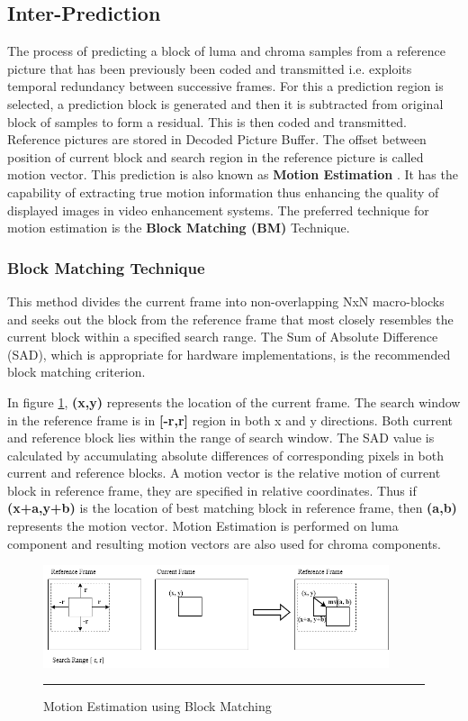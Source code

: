 
\subsection{Inter-Prediction}
The process of predicting a block of luma and chroma samples from a reference picture that has been previously been coded and transmitted i.e. exploits temporal redundancy between successive frames. For this a prediction region is selected, a prediction block is generated and then it is subtracted from original block of samples to form a residual. This is then coded and transmitted. Reference pictures are stored in Decoded Picture Buffer. The offset between position of current block and search region in the reference picture is called motion vector. This prediction is also known as \textbf{Motion Estimation} \cite{kalaycioglu2011low}. It has the capability of extracting true motion information thus enhancing the quality of displayed images in video enhancement systems. The preferred technique for motion estimation is the \textbf{Block Matching (BM)} Technique. 


\subsubsection{Block Matching Technique}
This method divides the current frame into non-overlapping NxN macro-blocks and seeks out the block from the reference frame that most closely resembles the current block within a specified search range. The Sum of Absolute Difference (SAD), which is appropriate for hardware implementations, is the recommended block matching criterion.

In figure \ref{fig:mv}, \textbf{(x,y)} represents the location of the current frame. The search window in the reference frame is in \textbf{[-r,r]} region in both x and y directions. Both current and reference block lies within the range of search window. The SAD value is calculated by accumulating absolute differences of corresponding pixels in both current and reference blocks. A motion vector is the relative motion of current block in reference frame, they are specified in relative coordinates. Thus if \textbf{(x+a,y+b)} is the location of best matching block in reference frame, then \textbf{(a,b)} represents the motion vector. Motion Estimation is performed on luma component and resulting motion vectors are also used for chroma components.

\begin{figure}[htbp]
	\centering
	\includegraphics[width = 4in]{./Figures/mv.png}
	\rule{35em}{0.5pt}
	\caption{Motion Estimation using Block Matching}
	\label{fig:mv}
\end{figure}

